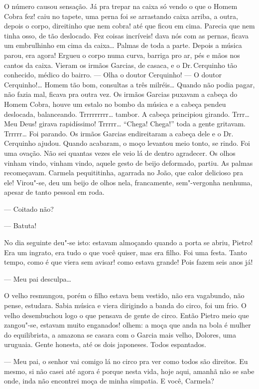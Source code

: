 O número causou sensação. Já pra trepar na caixa só vendo o que o Homem
Cobra fez! caiu no tapete, uma perna foi se arrastando caixa arriba, a
outra, depois o corpo, direitinho que nem cobra! até que ficou em cima.
Parecia que nem tinha osso, de tão deslocado. Fez coisas incríveis! dava
nós com as pernas, ficava um embrulhinho em cima da caixa\ldots{} Palmas de
toda a parte. Depois a música parou, era agora! Ergueu o corpo numa
curva, barriga pro ar, pés e mãos nos cantos da caixa. Vieram os irmãos
Garcias, de casaca, e o Dr.\,Cerquinho tão conhecido, médico do bairro.
--- Olha o doutor Cerquinho! --- O doutor Cerquinho!\ldots{} Homem tão bom,
consultas a três milréis\ldots{} Quando não podia pagar, não fazia mal,
ficava pra outra vez. Os irmãos Garcias puxavam a cabeça do Homem Cobra,
houve um estalo no bombo da música e a cabeça pendeu deslocada,
balanceando. Trrrrrrrrr\ldots{} tambor. A cabeça principiou girando. Trrr\ldots{}
Meu Deus! girava rapidíssimo! Trrrrr\ldots{} ``Chega! Chega!'' toda a gente
gritavam. Trrrrr\ldots{} Foi parando. Os irmãos Garcias endireitaram a cabeça
dele e o Dr.\,Cerquinho ajudou. Quando acabaram, o moço levantou meio
tonto, se rindo. Foi uma ovação. Não sei quantas vezes ele veio lá de
dentro agradecer. Os olhos vinham vindo, vinham vindo, aquele gesto de
beijo deformado, partiu. As palmas recomeçavam. Carmela pequititinha,
agarrada no João, que calor delicioso pra ele! Virou"-se, deu um beijo de
olhos nela, francamente, sem"-vergonha nenhuma, apesar de tanto pessoal
em roda.

--- Coitado não?

--- Batuta!

No dia seguinte deu"-se isto: estavam almoçando quando a porta se abriu,
Pietro! Era um ingrato, era tudo o que você quiser, mas era filho. Foi
uma festa. Tanto tempo, como é que viera sem avisar! como estava grande!
Pois fazem seis anos já!

--- Meu pai desculpa\ldots{}

O velho resmungou, porém o filho estava bem vestido, não era vagabundo,
não pense, estudara. Sabia música e viera dirigindo a banda do circo,
foi um frio. O velho desembuchou logo o que pensava de gente de circo.
Então Pietro meio que zangou"-se, estavam muito enganados! olhem: a moça
que anda na bola é mulher do equilibrista, a amazona se casara com o
Garcia mais velho, Dolores, uma uruguaia. Gente honesta, até os dois
japoneses. Todos espantados.

--- Meu pai, o senhor vai comigo lá no circo pra ver como todos são
direitos. Eu mesmo, si não casei até agora é porque nesta vida, hoje
aqui, amanhã não se sabe onde, inda não encontrei moça de minha
simpatia. E você, Carmela?

